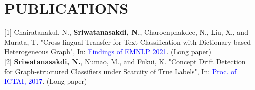 \section{PUBLICATIONS}

[1] Chairatanakul, N., \textbf{Sriwatanasakdi, N.}, Charoenphakdee, N., Liu, X., and Murata, T. "Cross-lingual Transfer for Text Classification with Dictionary-based Heterogeneous Graph", In: \textcolor{blue}{Findings of EMNLP 2021}. (Long paper)
\\
\vspace{7pt}
[2] \textbf{Sriwatanasakdi, N.}, Numao, M., and Fukui, K. "Concept  Drift  Detection  for Graph-structured Classifiers under Scarcity of True Labels", In: \textcolor{blue}{Proc. of ICTAI, 2017}. (Long paper)